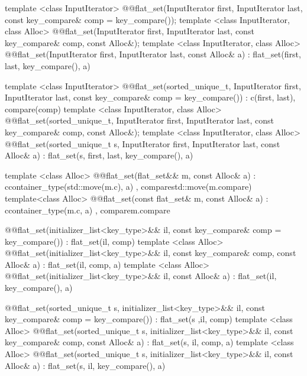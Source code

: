 \begin{codeblock}
{{    template <class InputIterator>
      @@flat_set(InputIterator first, InputIterator last,
                         const key_compare& comp = key_compare());
    template <class InputIterator, class Alloc>
      @@flat_set(InputIterator first, InputIterator last,
                         const key_compare& comp, const Alloc&);
    template <class InputIterator, class Alloc>
      @@flat_set(InputIterator first, InputIterator last, const Alloc& a)
        : flat_set(first, last, key_compare(), a) { }

    template <class InputIterator>
      @@flat_set(sorted_unique_t, InputIterator first, InputIterator last,
                         const key_compare& comp = key_compare())
        : c(first, last), compare(comp) { }
    template <class InputIterator, class Alloc>
      @@flat_set(sorted_unique_t, InputIterator first, InputIterator last,
                         const key_compare& comp, const Alloc&);
    template <class InputIterator, class Alloc>
      @@flat_set(sorted_unique_t s, InputIterator first, InputIterator last,
                         const Alloc& a)
        : flat_set(s, first, last, key_compare(), a) { }

    template <class Alloc>
      @@flat_set(flat_set&& m, const Alloc& a)
        : c{container_type(std::move(m.c), a)}
        , compare{std::move(m.compare)}
      { }
    template<class Alloc>
      @@flat_set(const flat_set& m, const Alloc& a)
        : c{container_type(m.c, a)}
        , compare{m.compare}
      { }

    @@flat_set(initializer_list<key_type>&& il,
                       const key_compare& comp = key_compare())
        : flat_set(il, comp) { }
    template <class Alloc>
      @@flat_set(initializer_list<key_type>&& il,
                         const key_compare& comp, const Alloc& a)
        : flat_set(il, comp, a) { }
    template <class Alloc>
      @@flat_set(initializer_list<key_type>&& il, const Alloc& a)
        : flat_set(il, key_compare(), a) { }

    @@flat_set(sorted_unique_t s, initializer_list<key_type>&& il,
                       const key_compare& comp = key_compare()) 
        : flat_set(s ,il, comp) { }
    template <class Alloc>
      @@flat_set(sorted_unique_t s, initializer_list<key_type>&& il,
                         const key_compare& comp, const Alloc& a) 
        : flat_set(s, il, comp, a) { }
    template <class Alloc>
      @@flat_set(sorted_unique_t s, initializer_list<key_type>&& il,
                         const Alloc& a)
        : flat_set(s, il, key_compare(), a) { }

}}
\end{codeblock}
